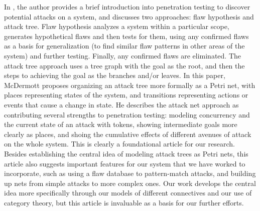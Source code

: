 \par In \cite{McDermott:2001:ANP:366173.366183}, the author provides a brief introduction into penetration testing to discover potential attacks on a system, and discusses two approaches: flaw hypothesis and attack tree. Flaw hypothesis analyzes a system within a particular scope, generates hypothetical flaws and then tests for them, using any confirmed flaws as a basis for generalization (to find similar flaw patterns in other areas of the system) and further testing. Finally, any confirmed flaws are eliminated. The attack tree approach uses a tree graph with the goal as the root, and then the steps to achieving the goal as the branches and/or leaves. In this paper, McDermott proposes organizing an attack tree more formally as a Petri net, with places representing states of the system, and transitions representing actions or events that cause a change in state. He describes the attack net approach as contributing several strengths to penetration testing: modeling concurrency and the current state of an attack with tokens, showing intermediate goals more clearly as places, and shoing the cumulative effects of different avenues of attack on the whole system. This is clearly a foundational article for our research. Besides establishing the central idea of modeling attack trees as Petri nets, this article also suggests important features for our system that we have worked to incorporate, such as using a flaw database to pattern-match attacks, and building up nets from simple attacks to more complex ones. Our work develops the central idea more specifically through our models of different connectives and our use of category theory, but this article is invaluable as a basis for our further efforts.
